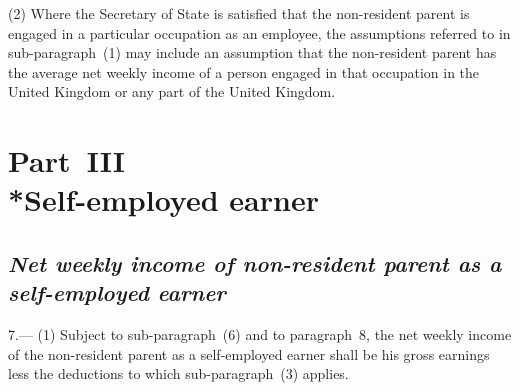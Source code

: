 \documentclass[12pt,a4paper]{article}
\begin{document}
(2) Where the 
Secretary of State  %
is satisfied that the non-resident parent is engaged in a particular occupation as an employee, the assumptions referred to in sub-paragraph~(1) may include an assumption that the non-resident parent has the average net weekly income of a person engaged in that occupation in the United Kingdom or any part of the United Kingdom.


\section[Part~III --- Self-employed earner]{Part~III\\*Self-employed earner}

\renewcommand\parthead{--- Schedule~Part~III}

\subsection*{\itshape 
Net weekly income of non-resident parent as a self-employed earner  %
}

7.---%
%
%
(1) Subject to sub-paragraph~(6) and to paragraph~8, the net weekly income of the non-resident parent as a self-employed earner shall be his gross earnings less the deductions to which sub-paragraph~(3) applies.
\end{document}
